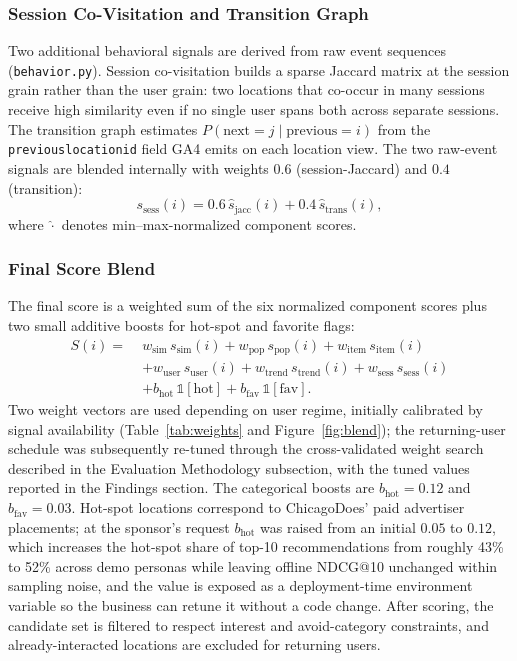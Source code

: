 \documentclass[12pt,letterpaper]{article}
\newcommand{\codeunderscore}{\discretionary{\textunderscore}{}{\textunderscore}}
\newcommand{\code}[1]{\begingroup\let\_\codeunderscore\texttt{\small #1}\endgroup}
\begin{document}
\subsubsection*{Session Co-Visitation and Transition Graph}
Two additional behavioral signals are derived from raw event sequences
(\code{behavior.py}). Session co-visitation builds a sparse Jaccard
matrix at the session grain rather than the user grain: two locations
that co-occur in many sessions receive high similarity even if no
single user spans both across separate sessions. The transition graph
estimates $P(\text{next}=j \mid \text{previous}=i)$ from the
\code{previous\_location\_id} field GA4 emits on each location view.
The two raw-event signals are blended internally with weights $0.6$
(session-Jaccard) and $0.4$ (transition):
\begin{equation}
  s_\text{sess}(i) = 0.6\,\hat{s}_\text{jacc}(i) + 0.4\,\hat{s}_\text{trans}(i),
\end{equation}
where $\hat{\cdot}$ denotes min--max-normalized component scores.

\subsubsection*{Final Score Blend}
The final score is a weighted sum of the six normalized component
scores plus two small additive boosts for hot-spot and favorite
flags:
\begin{align}
  S(i) =\; & w_\text{sim}\,s_\text{sim}(i)
           + w_\text{pop}\,s_\text{pop}(i)
           + w_\text{item}\,s_\text{item}(i) \nonumber\\
           & + w_\text{user}\,s_\text{user}(i)
           + w_\text{trend}\,s_\text{trend}(i)
           + w_\text{sess}\,s_\text{sess}(i) \nonumber\\
           & + b_\text{hot}\,\mathbb{1}[\text{hot}]
           + b_\text{fav}\,\mathbb{1}[\text{fav}].
  \label{eq:final}
\end{align}
Two weight vectors are used depending on user regime, initially
calibrated by signal availability (Table~\ref{tab:weights} and
Figure~\ref{fig:blend}); the returning-user schedule was subsequently
re-tuned through the cross-validated weight search described in
the Evaluation Methodology subsection, with the tuned values reported
in the Findings section. The categorical boosts are
$b_\text{hot} = 0.12$ and $b_\text{fav} = 0.03$. Hot-spot locations
correspond to ChicagoDoes' paid advertiser placements; at the
sponsor's request $b_\text{hot}$ was raised from an initial $0.05$ to
$0.12$, which increases the hot-spot share of top-10 recommendations
from roughly 43\% to 52\% across demo personas while leaving offline
NDCG@10 unchanged within sampling noise, and the value is exposed as a
deployment-time environment variable so the business can retune it
without a code change. After scoring, the
candidate set is filtered to respect interest and avoid-category
constraints, and already-interacted locations are excluded for
returning users.
\end{document}
